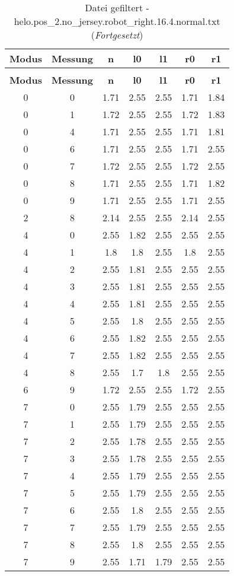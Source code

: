 \begin{longtable}{|c|c||c||c|c||c|c|}
	\caption{Datei gefiltert - helo.pos\_2.no\_jersey.robot\_right.16.4.normal.txt} \label{tab:helo.pos-2.no-jersey.robot-right.16.4.normal.txt} \\ \hline
	\textbf{Modus} & \textbf{Messung} & \textbf{n} & \textbf{l0} & \textbf{l1} & \textbf{r0} & \textbf{r1}\\ \hline
	\endfirsthead
	\caption[]{Datei gefiltert - helo.pos\_2.no\_jersey.robot\_right.16.4.normal.txt (\emph{Fortgesetzt})} \\ \hline
	\textbf{Modus} & \textbf{Messung} & \textbf{n} & \textbf{l0} & \textbf{l1} & \textbf{r0} & \textbf{r1}\\ \hline
	\endhead
	0 & 0 & 1.71 & 2.55 & 2.55 & 1.71 & 1.84 \\ \hline
	0 & 1 & 1.72 & 2.55 & 2.55 & 1.72 & 1.83 \\ \hline
	0 & 4 & 1.71 & 2.55 & 2.55 & 1.71 & 1.81 \\ \hline
	0 & 6 & 1.71 & 2.55 & 2.55 & 1.71 & 2.55 \\ \hline
	0 & 7 & 1.72 & 2.55 & 2.55 & 1.72 & 2.55 \\ \hline
	0 & 8 & 1.71 & 2.55 & 2.55 & 1.71 & 1.82 \\ \hline
	0 & 9 & 1.71 & 2.55 & 2.55 & 1.71 & 2.55 \\ \hline
	2 & 8 & 2.14 & 2.55 & 2.55 & 2.14 & 2.55 \\ \hline
	4 & 0 & 2.55 & 1.82 & 2.55 & 2.55 & 2.55 \\ \hline
	4 & 1 & 1.8 & 1.8 & 2.55 & 1.8 & 2.55 \\ \hline
	4 & 2 & 2.55 & 1.81 & 2.55 & 2.55 & 2.55 \\ \hline
	4 & 3 & 2.55 & 1.81 & 2.55 & 2.55 & 2.55 \\ \hline
	4 & 4 & 2.55 & 1.81 & 2.55 & 2.55 & 2.55 \\ \hline
	4 & 5 & 2.55 & 1.8 & 2.55 & 2.55 & 2.55 \\ \hline
	4 & 6 & 2.55 & 1.82 & 2.55 & 2.55 & 2.55 \\ \hline
	4 & 7 & 2.55 & 1.82 & 2.55 & 2.55 & 2.55 \\ \hline
	4 & 8 & 2.55 & 1.7 & 1.8 & 2.55 & 2.55 \\ \hline
	6 & 9 & 1.72 & 2.55 & 2.55 & 1.72 & 2.55 \\ \hline
	7 & 0 & 2.55 & 1.79 & 2.55 & 2.55 & 2.55 \\ \hline
	7 & 1 & 2.55 & 1.79 & 2.55 & 2.55 & 2.55 \\ \hline
	7 & 2 & 2.55 & 1.78 & 2.55 & 2.55 & 2.55 \\ \hline
	7 & 3 & 2.55 & 1.78 & 2.55 & 2.55 & 2.55 \\ \hline
	7 & 4 & 2.55 & 1.79 & 2.55 & 2.55 & 2.55 \\ \hline
	7 & 5 & 2.55 & 1.79 & 2.55 & 2.55 & 2.55 \\ \hline
	7 & 6 & 2.55 & 1.8 & 2.55 & 2.55 & 2.55 \\ \hline
	7 & 7 & 2.55 & 1.79 & 2.55 & 2.55 & 2.55 \\ \hline
	7 & 8 & 2.55 & 1.8 & 2.55 & 2.55 & 2.55 \\ \hline
	7 & 9 & 2.55 & 1.71 & 1.79 & 2.55 & 2.55 \\ \hline
\end{longtable}
